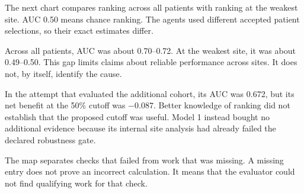 The next chart compares ranking across all patients with ranking at the weakest site. AUC 0.50 means chance ranking. The agents used different accepted patient selections, so their exact estimates differ.

\begin{center}
\end{center}

Across all patients, AUC was about 0.70--0.72. At the weakest site, it was about 0.49--0.50. This gap limits claims about reliable performance across sites. It does not, by itself, identify the cause.

In the attempt that evaluated the additional cohort, its AUC was 0.672, but its net benefit at the 50\% cutoff was $-0.087$. Better knowledge of ranking did not establish that the proposed cutoff was useful. Model 1 instead bought no additional evidence because its internal site analysis had already failed the declared robustness gate.

\newpage
{}
The map separates checks that failed from work that was missing. A missing entry does not prove an incorrect calculation. It means that the evaluator could not find qualifying work for that check.


